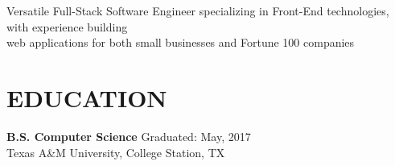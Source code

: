 \documentclass[margin,10pt]{res} %
\begin{document}

\address{{\bf Contact Information}\\ Phone: (512)-893-9148\\Email: jaideng123@yahoo.com \\}
\address{ {\bf Current Address} \\ 2708 Garden Springs Dr \\ Richardson, TX 75082 \\
       }

\begin{resume}
\section{}
\hspace*{-1.2in}Versatile Full-Stack Software Engineer specializing in
Front-End technologies, with experience building \\ \hspace*{-0.2in} web applications for
both small businesses and Fortune 100 companies

 
\section{EDUCATION}  {\bf B.S. Computer Science} Graduated: May, 2017  \\
                Texas A\&M University, College Station, TX
 
 

\end{resume}
\end{document}
